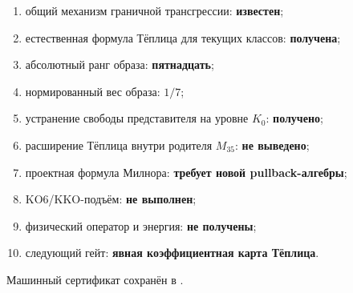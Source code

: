 \begin{protocol}
\begin{enumerate}
 \item общий механизм граничной трансгрессии: \textbf{известен};
 \item естественная формула Тёплица для текущих классов:
 \textbf{получена};
 \item абсолютный ранг образа: \textbf{пятнадцать};
 \item нормированный вес образа: \textbf{$1/7$};
 \item устранение свободы представителя на уровне $K_0$:
 \textbf{получено};
 \item расширение Тёплица внутри родителя $M_{35}$:
 \textbf{не выведено};
 \item проектная формула Милнора: \textbf{требует новой pullback-алгебры};
 \item KO6/KKO-подъём: \textbf{не выполнен};
 \item физический оператор и энергия: \textbf{не получены};
 \item следующий гейт: \textbf{явная коэффициентная карта Тёплица}.
\end{enumerate}
\end{protocol}

Машинный сертификат сохранён в
.